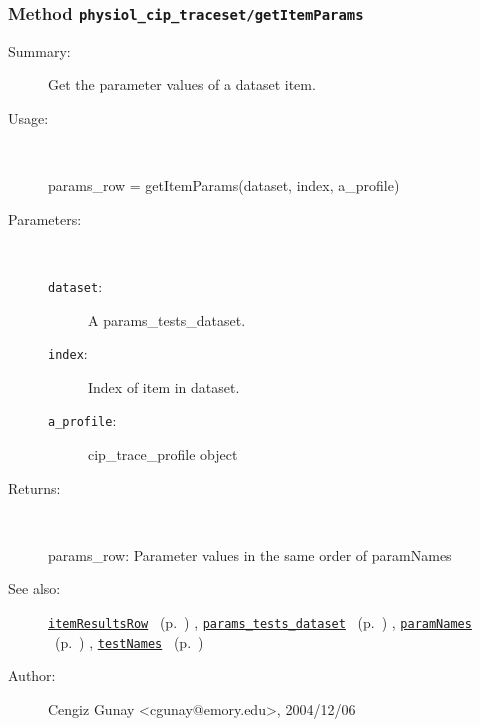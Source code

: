 \subsubsection[Method \texttt{getItemParams}]{Method \texttt{physiol\_cip\_traceset/getItemParams}}%
%
\label{ref_physiol_cip_traceset__getItemParams}%
\hypertarget{ref_physiol_cip_traceset__getItemParams}{}%
\begin{description}
\item[Summary:]Get the parameter values of a dataset item.
%
\item[Usage:]~%
\begin{lyxcode}%
params\_row = getItemParams(dataset, index, a\_profile)
%
\end{lyxcode}%
%
%
\item[Parameters:]~
\begin{description}%
\item[\texttt{dataset}:]
 A params\_tests\_dataset.
\item[\texttt{index}:]
 Index of item in dataset.
\item[\texttt{a\_profile}:]
 cip\_trace\_profile object
\end{description}%
%
\item[Returns:
]~

	params\_row: Parameter values in the same order of paramNames
%
%
\item[See also:]%
\hyperlink{ref_itemResultsRow}{\texttt{itemResultsRow}}%
\ (p.~\pageref{ref_itemResultsRow})%
%
, \hyperlink{ref_params_tests_dataset}{\texttt{params\_tests\_dataset}}%
\ (p.~\pageref{ref_params_tests_dataset})%
%
, \hyperlink{ref_paramNames}{\texttt{paramNames}}%
\ (p.~\pageref{ref_paramNames})%
%
, \hyperlink{ref_testNames}{\texttt{testNames}}%
\ (p.~\pageref{ref_testNames})%
%
%
\item[Author:]%
Cengiz Gunay <cgunay@emory.edu>, 2004/12/06
%
\end{description}
\methodline%
